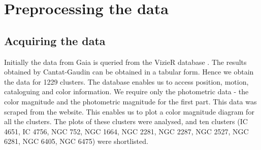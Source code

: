 \chapter{Preprocessing the data}\label{ch:ch2}

\section{Acquiring the data}
Initially the data from Gaia is queried from the VizieR database \citep{vizier}. The results obtained by Cantat-Gaudin \citep{cg} can be obtained in a tabular form. Hence we obtain the data for 1229 clusters. The database enables us to access position, motion, cataloguing and color information. We require only the photometric data - the color magnitude and the photometric magnitude for the first part. This data was scraped from the website. This enables us to plot a color magnitude diagram for all the clusters. The plots of these clusters were analysed, and ten clusters (IC 4651, IC 4756, NGC 752, NGC 1664, NGC 2281, NGC 2287, NGC 2527, NGC 6281, NGC 6405, NGC 6475) were shortlisted. 